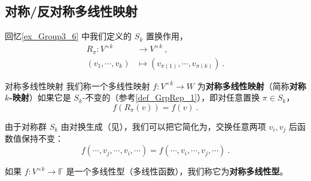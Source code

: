 
\begin{issues}
\issueDraft
\end{issues}


\subsection{对称/反对称多线性映射}

回忆\autoref{ex_Group3_6} 中我们定义的 $S_k$ 置换作用，
\begin{equation}
\begin{aligned}
R_\pi: V^{\times k} &\to V^{\times k}~, \\
(v_1, \cdots, v_k) &\mapsto (v_{\pi(1)}, \cdots, v_{\pi(k)})~.
\end{aligned}
\end{equation}

\begin{definition}{对称多线性映射}
我们称一个多线性映射 $f: V^{\times k} \to W$ 为\textbf{对称多线性映射}（简称\textbf{对称 $k$-映射}）如果它是 $S_k$-不变的（参考\autoref{def_GrpRep_1}），即对任意置换 $\pi \in S_k$，
\begin{equation}
f(R_\pi(v)) = f(v)~.
\end{equation}

由于对称群 $S_k$ 由对换生成（见），我们可以把它简化为，交换任意两项 $v_i, v_j$ 后函数值保持不变：
\begin{equation}
f(\cdots, v_j, \cdots, v_i, \cdots) = f(\cdots, v_i, \cdots, v_j, \cdots)~.
\end{equation}

如果 $f: V^{\times k} \to \mathbb{F}$ 是一个多线性型（多线性函数），我们称它为\textbf{对称多线性型}。
\end{definition}


%

